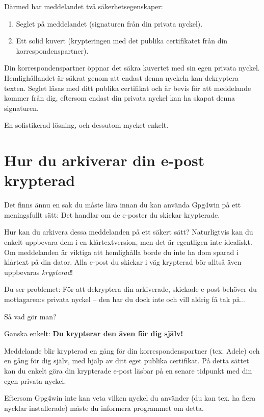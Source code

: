 \documentclass[a4paper,11pt, oneside,openright,titlepage,dvips]{scrbook}
\newcounter{part}
\newcounter{chapter}
\begin{document}
Därmed har meddelandet två säkerhetsegenskaper:

\begin{enumerate}
\item Seglet på meddelandet (signaturen
  från din privata nyckel).
\item Ett solid kuvert (krypteringen med det
  publika certifikatet från din korrespondenspartner).
\end{enumerate}

Din korrespondenspartner öppnar det säkra kuvertet med sin egen privata
nyckel. Hemlighållandet är säkrat genom att endast denna nyckeln kan
dekryptera texten. Seglet läsas med ditt publika certifikat och är bevis
för att meddelande kommer från dig, eftersom endast din privata nyckel
kan ha skapat denna signaturen.

En sofistikerad lösning, och dessutom mycket enkelt.



\clearpage
\chapter{Hur du arkiverar din e-post krypterad }
\label{ch:archive}

Det finns ännu en sak du måste lära innan du kan använda Gpg4win på 
ett meningsfullt sätt: Det handlar om de e-poster du skickar krypterade.

Hur kan du arkivera dessa meddelanden på ett säkert sätt?
Naturligtvis kan du enkelt uppbevara dem i en klårtextversion,
men det är egentligen inte idealiskt. Om meddelanden är viktiga
att hemlighålla borde du inte ha dom sparad i klårtext på din dator.
Alla e-post du skickar i väg krypterad bör alltså även uppbevaras
\textit{krypterad}!

Du ser problemet: För att dekryptera din arkiverade, skickade e-post
behöver du mottagaren:s privata nyckel -- den har du dock inte och vill
aldrig få tak på$\ldots$

Så vad gör man?

Ganska enkelt: \textbf{Du krypterar den även för dig
själv!}

Meddelande blir krypterad en gång för din korrespondenspartner (tex. Adele)
och en gång för dig själv, med hjälp av ditt eget publika certifikat. På
detta sättet kan du enkelt göra din krypterade e-post läsbar på en senare
tidpunkt med din egen privata nyckel.

Eftersom Gpg4win inte kan veta vilken nyckel du använder (du kan tex.
ha flera nycklar installerade) måste du informera programmet om detta.
\end{document}
